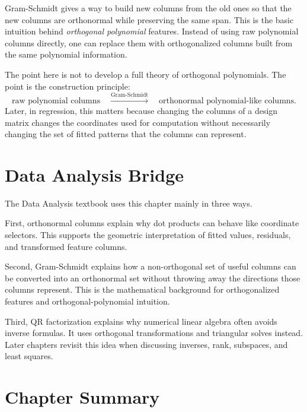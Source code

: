 Gram-Schmidt gives a way to build new columns from the old ones so that the new columns are orthonormal while preserving the same span. This is the basic intuition behind \emph{orthogonal polynomial} features. Instead of using raw polynomial columns directly, one can replace them with orthogonalized columns built from the same polynomial information.

The point here is not to develop a full theory of orthogonal polynomials. The point is the construction principle:
\[
    \text{raw polynomial columns}
    \quad\xrightarrow{\text{Gram-Schmidt}}\quad
    \text{orthonormal polynomial-like columns}.
\]
Later, in regression, this matters because changing the columns of a design matrix changes the coordinates used for computation without necessarily changing the set of fitted patterns that the columns can represent.

\section{Data Analysis Bridge}
\label{mf:ch09-data-analysis-bridge}

The Data Analysis textbook uses this chapter mainly in three ways.

First, orthonormal columns explain why dot products can behave like coordinate selectors. This supports the geometric interpretation of fitted values, residuals, and transformed feature columns.

Second, Gram-Schmidt explains how a non-orthogonal set of useful columns can be converted into an orthonormal set without throwing away the directions those columns represent. This is the mathematical background for orthogonalized features and orthogonal-polynomial intuition.

Third, QR factorization explains why numerical linear algebra often avoids inverse formulas. It uses orthogonal transformations and triangular solves instead. Later chapters revisit this idea when discussing inverses, rank, subspaces, and least squares.

\section{Chapter Summary}
\label{mf:orthogonal-bases-qr-summary}

